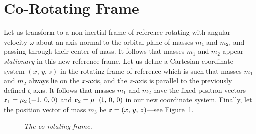 \section{Co-Rotating Frame}
Let us transform to a non-inertial frame of reference rotating with angular
velocity $\omega$ about an axis normal
to the orbital plane of masses $m_1$ and $m_2$, and passing through their center of mass. 
It
follows that masses $m_1$ and $m_2$ appear {\em stationary}\/ in this new reference frame.
Let us define a Cartesian coordinate system $(x,\,y,\,z)$ in the rotating frame of reference which is
such that masses $m_1$ and $m_2$ always lie on the $x$-axis, and the $z$-axis
is parallel to the previously defined $\zeta$-axis. It follows that masses
$m_1$ and $m_2$ have the fixed position vectors ${\bf r}_1=\mu_2\,(-1,\,0,\,0)$ and
${\bf r}_2=\mu_1\,(1,\,0,\,0)$ in our new coordinate system. Finally, let the position vector of
mass $m_3$ be ${\bf r} = (x,\,y,\,z)$---see Figure~\ref{f3b1}.

\begin{figure}
\epsfysize=2.25in
\centerline{}
\caption{\em The co-rotating frame.}\label{f3b1}
\end{figure}


